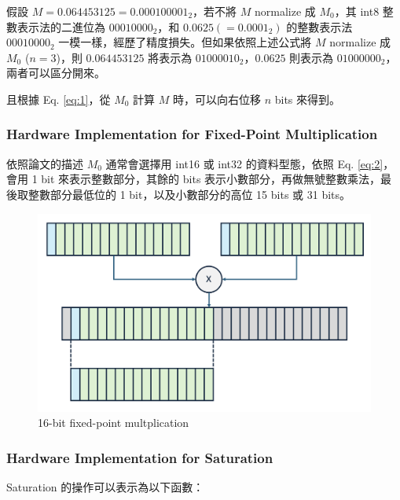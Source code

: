 \documentclass[12pt]{article}
\begin{document}
假設 $M = 0.064453125 = 0.000100001_2$，若不將 $M$ normalize 成 $M_0$，其 int8 整數表示法的二進位為 $00010000_2$，和 $0.0625 (= 0.0001_2)$ 的整數表示法 $00010000_2$ 一模一樣，經歷了精度損失。但如果依照上述公式將 $M$ normalize 成 $M_0$ ($n=3$)，則 $0.064453125$ 將表示為 $01000010_2$，$0.0625$ 則表示為 $01000000_2$，兩者可以區分開來。

且根據 Eq. \eqref{eq:1}，從 $M_0$ 計算 $M$ 時，可以向右位移 $n$ bits 來得到。

\subsubsection{Hardware Implementation for Fixed-Point Multiplication}

依照論文的描述 $M_0$ 通常會選擇用 int16 或 int32 的資料型態，依照 Eq. \eqref{eq:2}，會用 1 bit 來表示整數部分，其餘的 bits 表示小數部分，再做無號整數乘法，最後取整數部分最低位的 1 bit，以及小數部分的高位 15 bits 或 31 bits。

\begin{figure}[h]
    \includegraphics[scale=0.5]{./fixed-point-mul.png}
    \centering
    \caption{16-bit fixed-point multplication}
\end{figure}




\subsubsection{Hardware Implementation for Saturation}

Saturation 的操作可以表示為以下函數：
\end{document}
